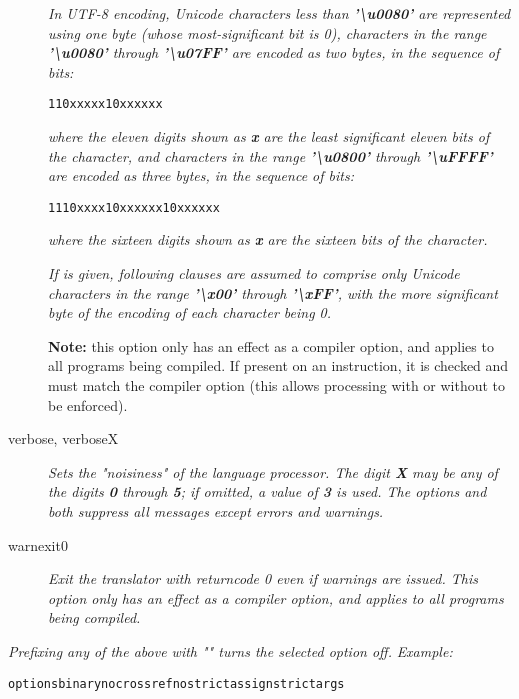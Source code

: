 \begin{description}
\emph{In UTF-8 encoding, Unicode characters less than \textbf{'\textbackslash{}u0080'} are
represented using one byte (whose most-significant bit is 0), characters
in the range \textbf{'\textbackslash{}u0080'} through \textbf{'\textbackslash{}u07FF'} are encoded
as two bytes, in the sequence of bits:}
\begin{alltt}
110xxxxx 10xxxxxx
\end{alltt}
\emph{where the eleven digits shown as \textbf{x} are the least
significant eleven bits of the character, and characters in the
range \textbf{'\textbackslash{}u0800'} through \textbf{'\textbackslash{}uFFFF'} are encoded as
three bytes, in the sequence of bits:}
\begin{alltt}
1110xxxx 10xxxxxx 10xxxxxx
\end{alltt}
\emph{where the sixteen digits shown as \textbf{x} are the
sixteen bits of the character.}
 
\emph{If  is given, following clauses are assumed to comprise
only Unicode characters in the range \textbf{'\textbackslash{}x00'}
through \textbf{'\textbackslash{}xFF'}, with the more significant byte of the
encoding of each character being 0.}
\begin{shaded}\noindent
\textbf{Note:}
this option only has an effect as a compiler option, and applies to
all programs being compiled.  If present on an 
instruction, it is checked and must match the compiler option (this
allows processing with or without  to be
enforced).
\end{shaded}\indent

\item[verbose, verboseX]
\emph{Sets the "noisiness" of the language processor.
The digit \textbf{\emph{X}} may be any of the digits \textbf{0}
through \textbf{5}; if omitted, a value of \textbf{3} is used.
The options  and  both suppress all
messages except errors and warnings.}

\item[warnexit0]
\emph{Exit the translator with returncode 0 even if warnings are issued. This option only has an effect as a compiler option, and applies to all programs being compiled.}
\end{description}
 
\emph{Prefixing any of the above with "" turns the selected
option off.}
 \emph{Example:}
\begin{alltt}
options binary nocrossref nostrictassign strictargs
\end{alltt}
 
